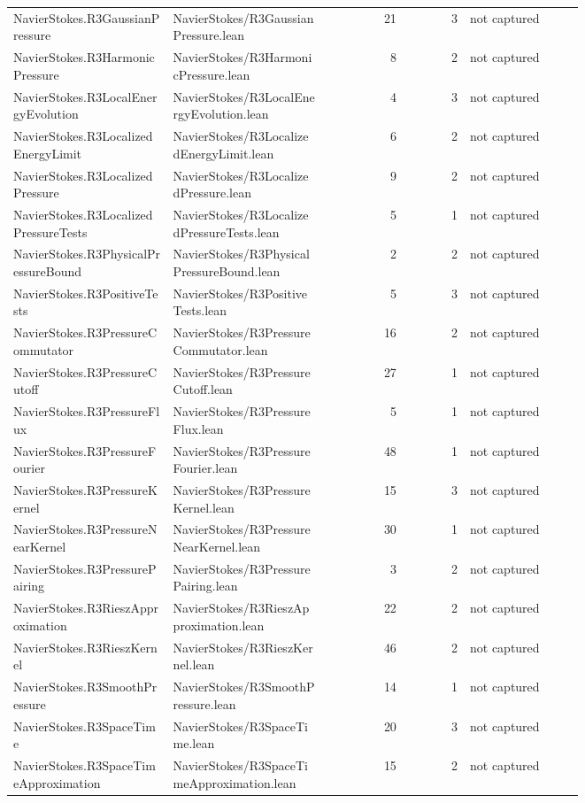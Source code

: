 \documentclass[10pt]{article}
\begin{document}
\begin{longtable}{p{0.28\linewidth}p{0.27\linewidth}r r p{0.20\linewidth}}
NavierStokes.R3GaussianPressure & NavierStokes/R3GaussianPressure.lean & 21 & 3 & not captured\\
NavierStokes.R3HarmonicPressure & NavierStokes/R3HarmonicPressure.lean & 8 & 2 & not captured\\
NavierStokes.R3LocalEnergyEvolution & NavierStokes/R3LocalEnergyEvolution.lean & 4 & 3 & not captured\\
NavierStokes.R3LocalizedEnergyLimit & NavierStokes/R3LocalizedEnergyLimit.lean & 6 & 2 & not captured\\
NavierStokes.R3LocalizedPressure & NavierStokes/R3LocalizedPressure.lean & 9 & 2 & not captured\\
NavierStokes.R3LocalizedPressureTests & NavierStokes/R3LocalizedPressureTests.lean & 5 & 1 & not captured\\
NavierStokes.R3PhysicalPressureBound & NavierStokes/R3PhysicalPressureBound.lean & 2 & 2 & not captured\\
NavierStokes.R3PositiveTests & NavierStokes/R3PositiveTests.lean & 5 & 3 & not captured\\
NavierStokes.R3PressureCommutator & NavierStokes/R3PressureCommutator.lean & 16 & 2 & not captured\\
NavierStokes.R3PressureCutoff & NavierStokes/R3PressureCutoff.lean & 27 & 1 & not captured\\
NavierStokes.R3PressureFlux & NavierStokes/R3PressureFlux.lean & 5 & 1 & not captured\\
NavierStokes.R3PressureFourier & NavierStokes/R3PressureFourier.lean & 48 & 1 & not captured\\
NavierStokes.R3PressureKernel & NavierStokes/R3PressureKernel.lean & 15 & 3 & not captured\\
NavierStokes.R3PressureNearKernel & NavierStokes/R3PressureNearKernel.lean & 30 & 1 & not captured\\
NavierStokes.R3PressurePairing & NavierStokes/R3PressurePairing.lean & 3 & 2 & not captured\\
NavierStokes.R3RieszApproximation & NavierStokes/R3RieszApproximation.lean & 22 & 2 & not captured\\
NavierStokes.R3RieszKernel & NavierStokes/R3RieszKernel.lean & 46 & 2 & not captured\\
NavierStokes.R3SmoothPressure & NavierStokes/R3SmoothPressure.lean & 14 & 1 & not captured\\
NavierStokes.R3SpaceTime & NavierStokes/R3SpaceTime.lean & 20 & 3 & not captured\\
NavierStokes.R3SpaceTimeApproximation & NavierStokes/R3SpaceTimeApproximation.lean & 15 & 2 & not captured\\

\end{longtable}
\end{document}
